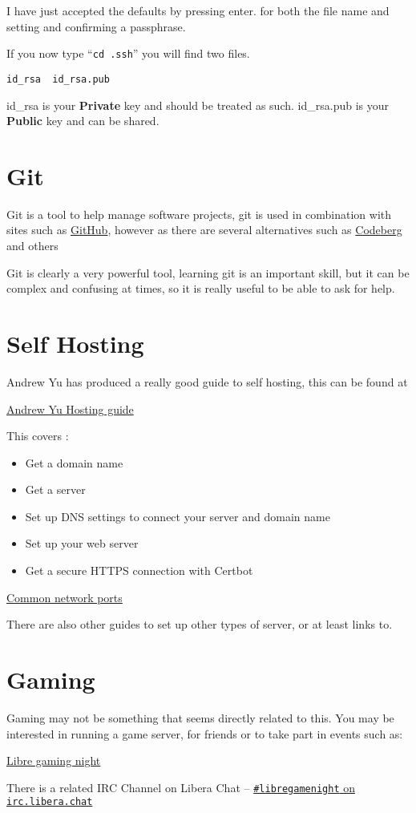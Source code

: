 \documentclass{extbook}
\newcommand\libera[1]{\href{https://web.libera.chat/?channel=\##1}{\texttt{\##1} on \texttt{irc.libera.chat}}}
\begin{document}
I have just accepted the defaults by pressing enter. for both the file name and setting and confirming a passphrase.

If you now type ``\verb|cd .ssh|'' you will find two files.

\begin{verbatim}
id_rsa  id_rsa.pub
\end{verbatim}

id\_rsa is your \textbf{Private} key and should be treated as such. id\_rsa.pub is your \textbf{Public} key and can be shared.

\section{Git}

Git is a tool to help manage software projects,  git is used in combination with sites such as \href{https://github.com/}{GitHub}, however as there are several alternatives such as
\href{https://codeberg.org/}{Codeberg} and others

Git is clearly a very powerful tool,  learning git is an important skill, but it can be complex and confusing at times, so it is really useful to be able to ask for help.



\section{Self Hosting}

Andrew Yu has produced a really good guide to self hosting,  this can be found at

\href{https://host.andrewyu.org/}{Andrew Yu Hosting guide}

This covers :

\begin{itemize}
\item Get a domain name
\item Get a server
\item Set up DNS settings to connect your server and domain name
\item Set up your web server
\item Get a secure HTTPS connection with Certbot
\end{itemize}

\href{https://networkverge.com/common-ports/}{Common network ports}

There are also other guides to set up other types of server, or at least links to.

\section{Gaming}

Gaming may not be something that seems directly related to this. You may be interested in running a game server, for friends or to take part in events such as:

\href{https://libregaming.org/}{Libre gaming night}

There is a related IRC Channel on Libera Chat -- \libera{libregamenight}
\end{document}
